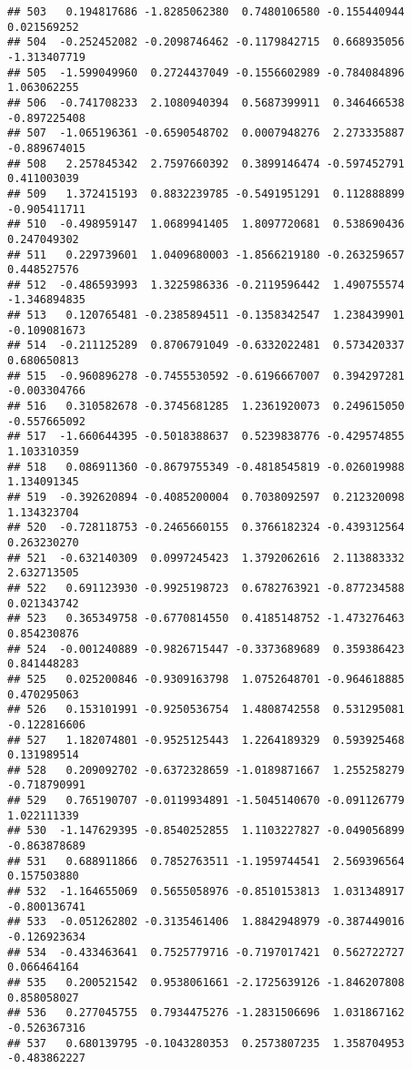 \documentclass[
]{article}
\begin{document}
\begin{verbatim}
## 503   0.194817686 -1.8285062380  0.7480106580 -0.155440944  0.021569252
## 504  -0.252452082 -0.2098746462 -0.1179842715  0.668935056 -1.313407719
## 505  -1.599049960  0.2724437049 -0.1556602989 -0.784084896  1.063062255
## 506  -0.741708233  2.1080940394  0.5687399911  0.346466538 -0.897225408
## 507  -1.065196361 -0.6590548702  0.0007948276  2.273335887 -0.889674015
## 508   2.257845342  2.7597660392  0.3899146474 -0.597452791  0.411003039
## 509   1.372415193  0.8832239785 -0.5491951291  0.112888899 -0.905411711
## 510  -0.498959147  1.0689941405  1.8097720681  0.538690436  0.247049302
## 511   0.229739601  1.0409680003 -1.8566219180 -0.263259657  0.448527576
## 512  -0.486593993  1.3225986336 -0.2119596442  1.490755574 -1.346894835
## 513   0.120765481 -0.2385894511 -0.1358342547  1.238439901 -0.109081673
## 514  -0.211125289  0.8706791049 -0.6332022481  0.573420337  0.680650813
## 515  -0.960896278 -0.7455530592 -0.6196667007  0.394297281 -0.003304766
## 516   0.310582678 -0.3745681285  1.2361920073  0.249615050 -0.557665092
## 517  -1.660644395 -0.5018388637  0.5239838776 -0.429574855  1.103310359
## 518   0.086911360 -0.8679755349 -0.4818545819 -0.026019988  1.134091345
## 519  -0.392620894 -0.4085200004  0.7038092597  0.212320098  1.134323704
## 520  -0.728118753 -0.2465660155  0.3766182324 -0.439312564  0.263230270
## 521  -0.632140309  0.0997245423  1.3792062616  2.113883332  2.632713505
## 522   0.691123930 -0.9925198723  0.6782763921 -0.877234588  0.021343742
## 523   0.365349758 -0.6770814550  0.4185148752 -1.473276463  0.854230876
## 524  -0.001240889 -0.9826715447 -0.3373689689  0.359386423  0.841448283
## 525   0.025200846 -0.9309163798  1.0752648701 -0.964618885  0.470295063
## 526   0.153101991 -0.9250536754  1.4808742558  0.531295081 -0.122816606
## 527   1.182074801 -0.9525125443  1.2264189329  0.593925468  0.131989514
## 528   0.209092702 -0.6372328659 -1.0189871667  1.255258279 -0.718790991
## 529   0.765190707 -0.0119934891 -1.5045140670 -0.091126779  1.022111339
## 530  -1.147629395 -0.8540252855  1.1103227827 -0.049056899 -0.863878689
## 531   0.688911866  0.7852763511 -1.1959744541  2.569396564  0.157503880
## 532  -1.164655069  0.5655058976 -0.8510153813  1.031348917 -0.800136741
## 533  -0.051262802 -0.3135461406  1.8842948979 -0.387449016 -0.126923634
## 534  -0.433463641  0.7525779716 -0.7197017421  0.562722727  0.066464164
## 535   0.200521542  0.9538061661 -2.1725639126 -1.846207808  0.858058027
## 536   0.277045755  0.7934475276 -1.2831506696  1.031867162 -0.526367316
## 537   0.680139795 -0.1043280353  0.2573807235  1.358704953 -0.483862227

\end{verbatim}
\end{document}
